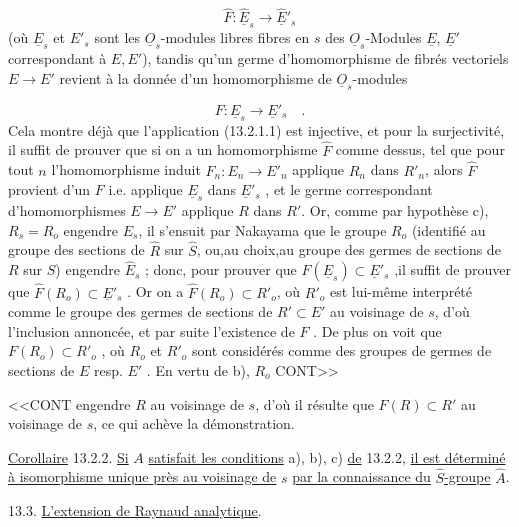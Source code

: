 \begin{equation*}
\hat{F} : \hat{\underline{E}}_s \longrightarrow \hat{\underline{E}}'_s
\end{equation*}
(où $\underline{E}_s$ et $E'_s$ sont les $\underline{O}_s$-modules libres fibres en $s$ des $\underline{O}_s$-Modules $\underline{E}$, $\underline{E}'$ correspondant à $E,E'$), tandis qu'un germe d'homomorphisme de fibrés vectoriels $E \longrightarrow E'$ revient à la donnée d'un homomorphisme de $\underline{O}_s$-modules

\begin{equation*}
F : \underline{E}_s \longrightarrow \underline{E}'_s \quad .
\end{equation*}
Cela montre déjà que l'application (13.2.1.1) est injective, et pour la surjectivité, il suffit de prouver que si on a un homomorphisme $\hat{F}$ comme dessus, tel que pour tout $n$ l'homomorphisme induit $F_n : E_n \longrightarrow E'_n$ applique $R_n$ dans $R'_n$, alors $\hat{F}$ provient d'un $F$ i.e. applique $\underline{E}_s$ dans $\underline{E}'_s$ , et le germe correspondant d'homomorphismes $E \longrightarrow E'$ applique $R$ dans $R'$. Or, comme par hypothèse c), $R_s = R_o$ engendre $E_s$, il s'ensuit par Nakayama que le groupe $R_o$ (identifié au groupe des sections de $\hat{R}$ sur $\hat{S}$, ou,au choix,au groupe des germes de sections de $R$ sur $S$) engendre $\hat{E}_s$ ; donc, pour prouver que $\hat{F}(\underline{E}_s) \subset \underline{E}'_s$ ,il suffit de prouver que $\hat{F}(R_o) \subset \underline{E}'_s$ . Or on a $\hat{F}(R_o) \subset R'_o$, où $R'_o$ est lui-même interprété comme le groupe des germes de sections de $R' \subset E'$ au voisinage de $s$, d'où l'inclusion annoncée, et par suite l'existence de $F$ . De plus on voit que $F(R_o) \subset R'_o$ , où $R_o$ et $R'_o$ sont considérés comme des groupes de germes de sections de $E$ resp. $E'$ . En vertu de b), $R_o$ CONT>>



<<CONT engendre $R$ au voisinage de $s$, d'où il résulte que $F(R) \subset R'$ au voisinage de $s$, ce qui achève la démonstration.

\underline{Corollaire} 13.2.2. \underline{Si} $A$ \underline{satisfait les conditions} a), b), c) \underline{de} 13.2.2, \underline{il est déterminé à isomorphisme unique près au voisinage de} $s$ \underline{par la connaissance du} $\hat{S}$\underline{-groupe} $\hat{A}$.


13.3. \underline{L'extension de Raynaud analytique}.

